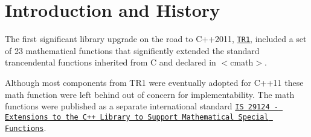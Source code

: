 \hypertarget{index_intro}{}\section{Introduction and History}\label{index_intro}
The first significant library upgrade on the road to C++2011, \href{http://www.open-std.org/JTC1/SC22/WG21/docs/papers/2005/n1836.pdf}{\tt T\+R1}, included a set of 23 mathematical functions that significntly extended the standard trancendental functions inherited from C and declared in $<$cmath$>$.

Although most components from T\+R1 were eventually adopted for C++11 these math function were left behind out of concern for implementability. The math functions were published as a separate international standard \href{http://www.open-std.org/JTC1/SC22/WG21/docs/papers/2010/n3060.pdf}{\tt I\+S 29124 -\/ Extensions to the C++ Library to Support Mathematical Special Functions}.

